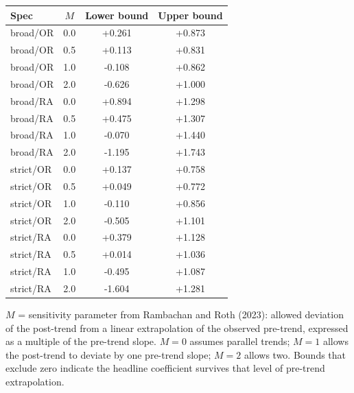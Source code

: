 \begin{threeparttable}
\caption{Roth-Sant'Anna pre-trend honest bounds at $e = +1$ (firearm suicide rate, per 100k)}
\label{tab:rs_bounds}
\begin{tabular}{lccc}
\toprule
Spec & $M$ & Lower bound & Upper bound \\
\midrule
  broad/OR & 0.0 & +0.261 & +0.873 \\
  broad/OR & 0.5 & +0.113 & +0.831 \\
  broad/OR & 1.0 & -0.108 & +0.862 \\
  broad/OR & 2.0 & -0.626 & +1.000 \\
  broad/RA & 0.0 & +0.894 & +1.298 \\
  broad/RA & 0.5 & +0.475 & +1.307 \\
  broad/RA & 1.0 & -0.070 & +1.440 \\
  broad/RA & 2.0 & -1.195 & +1.743 \\
  strict/OR & 0.0 & +0.137 & +0.758 \\
  strict/OR & 0.5 & +0.049 & +0.772 \\
  strict/OR & 1.0 & -0.110 & +0.856 \\
  strict/OR & 2.0 & -0.505 & +1.101 \\
  strict/RA & 0.0 & +0.379 & +1.128 \\
  strict/RA & 0.5 & +0.014 & +1.036 \\
  strict/RA & 1.0 & -0.495 & +1.087 \\
  strict/RA & 2.0 & -1.604 & +1.281 \\
\bottomrule
\end{tabular}
\begin{tablenotes}\footnotesize
\item $M$ = sensitivity parameter from Rambachan and Roth (2023): allowed deviation of the post-trend from a linear extrapolation of the observed pre-trend, expressed as a multiple of the pre-trend slope. $M = 0$ assumes parallel trends; $M = 1$ allows the post-trend to deviate by one pre-trend slope; $M = 2$ allows two. Bounds that exclude zero indicate the headline coefficient survives that level of pre-trend extrapolation.
\end{tablenotes}
\end{threeparttable}
